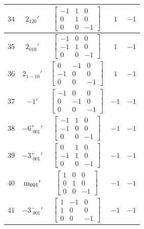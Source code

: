 \documentclass[fleqn,8pt]{jsarticle}
\begin{document}
\begin{longtable}{ccccc}
$ 34 $ & $ 2{}_{120}{}' $ & $ \begin{bmatrix} -1 & 1 & 0 \\ 0 & 1 & 0 \\ 0 & 0 & -1 \end{bmatrix} $ & $ 1 $ & $ -1 $ \\ \hline
$ 35 $ & $ 2{}_{010}{}' $ & $ \begin{bmatrix} -1 & 0 & 0 \\ -1 & 1 & 0 \\ 0 & 0 & -1 \end{bmatrix} $ & $ 1 $ & $ -1 $ \\ \hline
$ 36 $ & $ 2{}_{1-10}{}' $ & $ \begin{bmatrix} 0 & -1 & 0 \\ -1 & 0 & 0 \\ 0 & 0 & -1 \end{bmatrix} $ & $ 1 $ & $ -1 $ \\ \hline
$ 37 $ & $ -1{}' $ & $ \begin{bmatrix} -1 & 0 & 0 \\ 0 & -1 & 0 \\ 0 & 0 & -1 \end{bmatrix} $ & $ -1 $ & $ -1 $ \\ \hline
$ 38 $ & $ -6^{+}_{\,\,001}{}' $ & $ \begin{bmatrix} -1 & 1 & 0 \\ -1 & 0 & 0 \\ 0 & 0 & -1 \end{bmatrix} $ & $ -1 $ & $ -1 $ \\ \hline
$ 39 $ & $ -3^{+}_{\,\,001}{}' $ & $ \begin{bmatrix} 0 & 1 & 0 \\ -1 & 1 & 0 \\ 0 & 0 & -1 \end{bmatrix} $ & $ -1 $ & $ -1 $ \\ \hline
$ 40 $ & $ {\rm m}_{001}{}' $ & $ \begin{bmatrix} 1 & 0 & 0 \\ 0 & 1 & 0 \\ 0 & 0 & -1 \end{bmatrix} $ & $ -1 $ & $ -1 $ \\ \hline
$ 41 $ & $ -3^{-}_{\,\,001}{}' $ & $ \begin{bmatrix} 1 & -1 & 0 \\ 1 & 0 & 0 \\ 0 & 0 & -1 \end{bmatrix} $ & $ -1 $ & $ -1 $ \\ \hline

\end{longtable}
\end{document}
